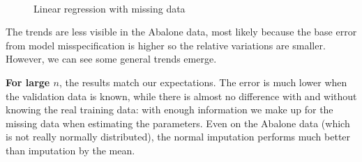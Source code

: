 \documentclass[12pt, a4paper]{memoir}
\begin{document}
\begin{figure}[h]
  \centering
  \\
  \caption{Linear regression with missing data}
  \label{fig.linreg}
\end{figure}

The trends are less visible in the Abalone data, most likely because the base error from model misspecification is higher so the relative variations are smaller. However, we can see some general trends emerge.

\textbf{For large $n$}, the results match our expectations. The error is much lower when the validation data is known, while there is almost no difference with and without knowing the real training data: with enough information we make up for the missing data when estimating the parameters. Even on the Abalone data (which is not really normally distributed), the normal imputation performs much better than imputation by the mean.
\end{document}
